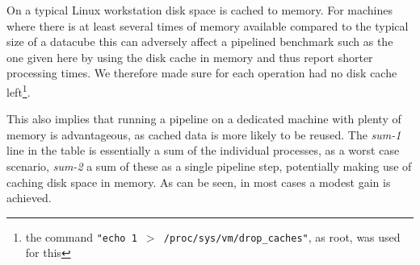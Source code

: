 \documentclass{article}
\begin{document}
On a typical Linux workstation disk space is cached to memory. For
machines where there is at least several times of memory available
compared to the typical size of a datacube this can adversely affect
a pipelined benchmark such as the one given here by using the
disk cache in memory and thus report shorter processing times.
We therefore made sure
for each operation had no disk cache left\footnote{the command
{\tt "echo 1 $>$ /proc/sys/vm/drop\_caches"}, as root, was used for this}.


This also implies that running a pipeline on a dedicated machine
with plenty of memory is advantageous, as cached data is more likely
to be reused. The {\it sum-1} line in the table is essentially
a sum of the individual processes, as a worst case
scenario, {\it sum-2} a sum of 
these as a single pipeline step, potentially making use of caching
disk space in memory. As can be seen, in most cases a modest
gain is achieved.
\end{document}
